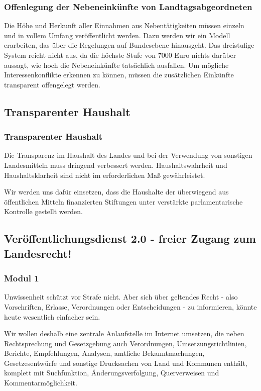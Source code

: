 \subsubsection{Offenlegung der Nebeneinkünfte von Landtagsabgeordneten}
\abstimmung
Die Höhe und Herkunft aller Einnahmen aus Nebentätigkeiten müssen einzeln und in vollem Umfang veröffentlicht werden. Dazu werden wir ein Modell erarbeiten, das über die Regelungen auf Bundesebene hinausgeht. Das dreistufige System reicht nicht aus, da die höchste Stufe von 7000 Euro nichts darüber aussagt, wie hoch die Nebeneinkünfte tatsächlich ausfallen. Um mögliche Interessenkonflikte erkennen zu können, müssen die zusätzlichen Einkünfte transparent offengelegt werden.
 
\subsection*{Transparenter Haushalt}
\subsubsection{Transparenter Haushalt}
\abstimmung
Die Transparenz im Haushalt des Landes und bei der Verwendung von sonstigen Landesmitteln muss dringend verbessert werden. Haushaltswahrheit und Haushaltsklarheit sind nicht im erforderlichen Maß gewährleistet.

Wir werden uns dafür einsetzen, dass die Haushalte der überwiegend aus öffentlichen Mitteln finanzierten Stiftungen unter verstärkte parlamentarische Kontrolle gestellt werden.
 
\subsection*{Veröffentlichungsdienst 2.0 - freier Zugang zum Landesrecht!}
\subsubsection{Modul 1}
\abstimmung
Unwissenheit schützt vor Strafe nicht. Aber sich über geltendes Recht - also Vorschriften, Erlasse, Verordnungen oder Entscheidungen - zu informieren, könnte heute wesentlich einfacher sein.

Wir wollen deshalb eine zentrale Anlaufstelle im Internet umsetzen, die neben Rechtsprechung und Gesetzgebung auch Verordnungen, Umsetzungsrichtlinien, Berichte, Empfehlungen, Analysen, amtliche Bekanntmachungen, Gesetzesentwürfe und sonstige Drucksachen von Land und Kommunen enthält, komplett mit Suchfunktion, Änderungsverfolgung, Querverweisen und Kommentarmöglichkeit.

